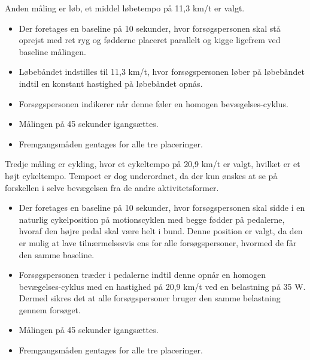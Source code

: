 Anden måling er løb, et middel løbetempo på 11,3 km/t er valgt\citep{Miles 2007}. \vspace{-3mm}
\begin{itemize}
	\item Der foretages en baseline på 10 sekunder, hvor forsøgspersonen skal stå oprejst med ret ryg og fødderne placeret parallelt og kigge ligefrem ved baseline målingen.
	\item Løbebåndet indstilles til 11,3 km/t, hvor forsøgspersonen løber på løbebåndet indtil en konstant hastighed på løbebåndet opnås. 
	\item Forsøgspersonen indikerer når denne føler en homogen bevægelses-cyklus.
	\item Målingen på 45 sekunder igangsættes.
	\item Fremgangsmåden gentages for alle tre placeringer.
\end{itemize}
 
Tredje måling er cykling, hvor et cykeltempo på 20,9 km/t er valgt, hvilket er et højt cykeltempo\citep{Miles 2007}. Tempoet er dog underordnet, da der kun ønskes at se på forskellen i selve bevægelsen fra de andre aktivitetsformer. \vspace{-3mm}
\begin{itemize}
	\item Der foretages en baseline på 10 sekunder, hvor forsøgspersonen skal sidde i en naturlig cykelposition på motionscyklen med begge fødder på pedalerne, hvoraf den højre pedal skal være helt i bund. Denne position er valgt, da den er mulig at lave tilnærmelsesvis ens for alle forsøgspersoner, hvormed de får den samme baseline.
	\item Forsøgspersonen træder i pedalerne indtil denne opnår en homogen bevægelses-cyklus med en hastighed på 20,9 km/t ved en belastning på 35 W. Dermed sikres det at alle forsøgspersoner bruger den samme belastning gennem forsøget.  
	\item Målingen på 45 sekunder igangsættes. 
	\item Fremgangsmåden gentages for alle tre placeringer.
\end{itemize}

